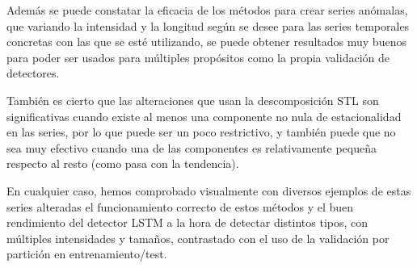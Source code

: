Además se puede constatar la eficacia de los métodos para crear series anómalas, que variando la intensidad y la longitud según se desee para las series temporales concretas con las que se esté utilizando, se puede obtener resultados muy buenos para poder ser usados para múltiples propósitos como la propia validación de detectores.

También es cierto que las alteraciones que usan la descomposición STL son significativas cuando existe al menos una componente no nula de estacionalidad en las series, por lo que puede ser un poco restrictivo, y también puede que no sea muy efectivo cuando una de las componentes es relativamente pequeña respecto al resto (como pasa con la tendencia).

En cualquier caso, hemos comprobado visualmente con diversos ejemplos de estas series alteradas el funcionamiento correcto de estos métodos y el buen rendimiento del detector LSTM a la hora de detectar distintos tipos, con múltiples intensidades y tamaños, contrastado con el uso de la validación por partición en entrenamiento/test.

\endinput
